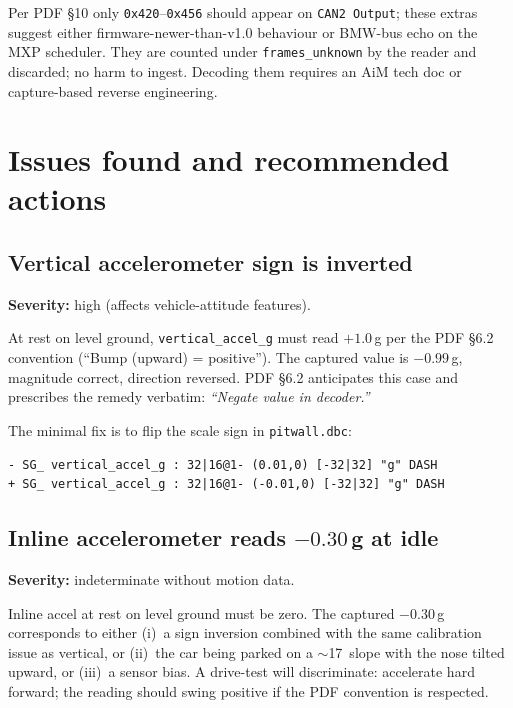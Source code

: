 \documentclass[11pt,a4paper]{article}
\newcommand{\hex}[1]{\texttt{0x#1}}
\begin{document}
Per PDF \S 10 only \hex{420}--\hex{456} should appear on \texttt{CAN2
Output}; these extras suggest either firmware-newer-than-v1.0
behaviour or BMW-bus echo on the MXP scheduler. They are counted
under \texttt{frames\_unknown} by the reader and discarded; no harm
to ingest. Decoding them requires an AiM tech doc or capture-based
reverse engineering.

\section{Issues found and recommended actions}

\subsection{Vertical accelerometer sign is inverted}

\textbf{Severity:} high (affects vehicle-attitude features).

At rest on level ground, \texttt{vertical\_accel\_g} must read
$+1.0$\,g per the PDF \S 6.2 convention (``Bump (upward) =
positive''). The captured value is $-0.99$\,g, magnitude correct,
direction reversed. PDF \S 6.2 anticipates this case and prescribes
the remedy verbatim: \emph{``Negate value in decoder.''}

The minimal fix is to flip the scale sign in \texttt{pitwall.dbc}:

\begin{lstlisting}
- SG_ vertical_accel_g : 32|16@1- (0.01,0) [-32|32] "g" DASH
+ SG_ vertical_accel_g : 32|16@1- (-0.01,0) [-32|32] "g" DASH
\end{lstlisting}

\subsection{Inline accelerometer reads $-0.30$\,g at idle}

\textbf{Severity:} indeterminate without motion data.

Inline accel at rest on level ground must be zero. The captured
$-0.30$\,g corresponds to either (i)~a sign inversion combined with
the same calibration issue as vertical, or (ii)~the car being
parked on a $\sim$17\textdegree\ slope with the nose tilted upward, or
(iii)~a sensor bias. A drive-test will discriminate: accelerate hard
forward; the reading should swing positive if the PDF convention is
respected.
\end{document}
